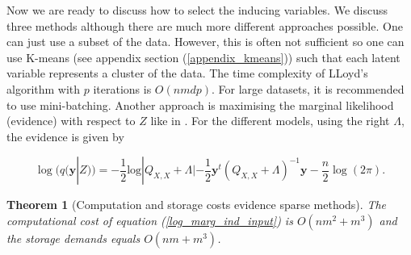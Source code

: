 \documentclass[12pt,a4paper,oneside]{book}
\newtheorem{Theorem}{Theorem}
\begin{document}
Now we are ready to discuss how to select the inducing variables. We discuss three methods although there are much more different approaches possible. One can just use a subset of the data. However, this is often not sufficient so one can use K-means (see appendix section (\ref{appendix_kmeans})) such that each latent variable represents a cluster of the data. The time complexity of LLoyd's algorithm with $p$ iterations is $O(nmdp)$. For large datasets, it is recommended to use mini-batching.  Another approach is maximising the marginal likelihood (evidence) with respect to $Z$ like in \cite{snelson2006sparse}. For the different models, using the right $\Lambda$, the evidence is given by 

\begin{equation}\label{log_marg_ind_input}
\log ( q(\bm{y}|Z)) = -\dfrac{1}{2} \text{log}|Q_{X,X}+\Lambda| - \dfrac{1}{2} \bm{y}^t (Q_{X,X} + \Lambda)^{-1} \bm{y} - \dfrac{n}{2} \log{(2\pi)}.
\end{equation}


\begin{Theorem}[Computation and storage costs evidence sparse methods]\label{time_compl_evid_approx}
The computational cost of equation (\ref{log_marg_ind_input}) is $O(nm^2 + m^3)$ and the storage demands equals $O(nm + m^3)$.
\end{Theorem}
\end{document}
